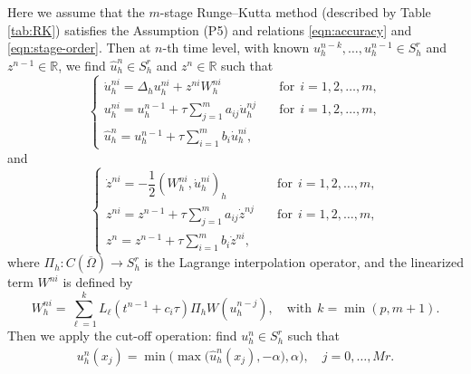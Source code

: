\documentclass[a4paper, oneside]{book}
\begin{document}
Here we assume that the  $m$-stage Runge--Kutta method (described by Table \ref{tab:RK}) satisfies
the Assumption (P5) and relations \eqref{eqn:accuracy} and \eqref{eqn:stage-order}. Then at $n$-th time level,
with known $u_h^{n-k}, \ldots, u_h^{n-1} \in S_h^r$ and $z^{n-1}\in \mathbb{R}$,
we find $\hat u_h^n \in S_h^r$ and $z^n\in \mathbb{R}$ such that
\begin{equation}\label{eqn:AC-sav-fully}
    \begin{cases}
    \dot u_h^{ni} = \Delta_h u_h^{ni} +  z^{ni} W_h^{ni}&\quad \text{for} ~~i=1,2,\dots,m, \\ %
    u_h^{ni} = u_h^{n-1} + \tau \sum_{j=1}^m a_{ij} \dot u_h^{nj} &\quad \text{for} ~~i=1,2,\dots,m, \\
    \hat u_h^{n} = u_h^{n-1} + \tau \sum_{i=1}^m b_i \dot u_h^{ni},
  \end{cases}
\end{equation}
and
\begin{equation}\label{eqn:r-fully}
\begin{cases}
    \dot z^{ni} = - \dfrac12(W_h^{ni},   \dot u_h^{ni})_h &\quad \text{for} ~~i=1,2,\dots,m, \\
    z^{ni} = z^{n-1} + \tau \sum_{j=1}^m a_{ij}  \dot z^{nj}&\quad \text{for} ~~i=1,2,\dots,m, \\
   z^{n} = z^{n-1} +  \tau \sum_{i=1}^m b_i  \dot z^{ni},
 \end{cases}
\end{equation}
where $\Pi_h:C(\overline\Omega)\rightarrow S_h^r$ is the Lagrange interpolation operator, and the linearized term $W^{ni}$ is  defined by
$$ W_h^{ni} =  \sum_{\ell=1}^k L_{\ell}(t^{n-1}+c_i\tau)\Pi_h W(u_h^{n-j}),\quad \text{with} ~~k=\min(p,m+1). $$
Then we apply the cut-off operation: find $u_h^n \in S_h^r$ such that
\begin{equation}\label{eqn:truncation-fully-sav}
\begin{split}
u_h^n(x_j)  = \min\big(\max \big(\hat u_h^n(x_j), - \alpha \big) , \alpha \big),  \quad j=0,\dots,Mr.
\end{split}
\end{equation}
\end{document}
